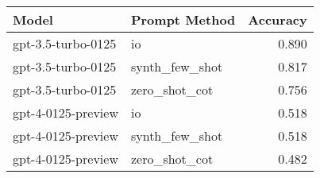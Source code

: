 \begin{tabular}{llr}
\toprule
Model & Prompt Method & Accuracy \\
\midrule
gpt-3.5-turbo-0125 & io & 0.890 \\
gpt-3.5-turbo-0125 & synth_few_shot & 0.817 \\
gpt-3.5-turbo-0125 & zero_shot_cot & 0.756 \\
gpt-4-0125-preview & io & 0.518 \\
gpt-4-0125-preview & synth_few_shot & 0.518 \\
gpt-4-0125-preview & zero_shot_cot & 0.482 \\
\bottomrule
\end{tabular}

